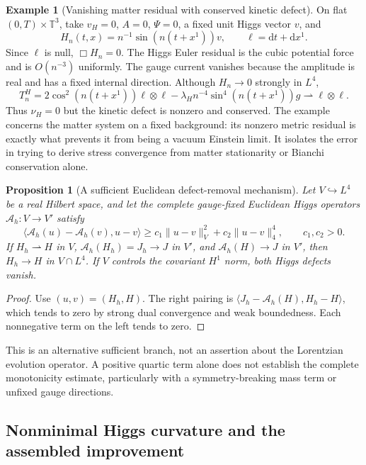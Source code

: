 \documentclass[11pt]{article}
\numberwithin{equation}{section}
\newtheorem{proposition}[proposition]{Proposition}
\theoremstyle{definition}
\newtheorem{example}[example]{Example}
\theoremstyle{remark}
\newcommand{\dd}{\mathrm d}
\newcommand{\norm}[1]{\lVert#1\rVert}
\newcommand{\ip}[2]{\langle#1,#2\rangle}
\begin{document}
\begin{example}[Vanishing matter residual with conserved kinetic defect]
\label{ex:null-wave}
On flat $(0,T)\times\mathbb T^3$, take $v_H=0$, $A=0$, $\Psi=0$, a fixed unit Higgs vector $v$, and
\[
 H_n(t,x)=n^{-1}\sin(n(t+x^1))v,
 \qquad \ell=\dd t+\dd x^1.
\]
Since $\ell$ is null, $\Box H_n=0$. The Higgs Euler residual is the cubic potential force and is $O(n^{-3})$ uniformly. The gauge current vanishes because the amplitude is real and has a fixed internal direction. Although $H_n\to0$ strongly in $L^4$,
\[
 T^H_n
 =2\cos^2(n(t+x^1))\ell\otimes\ell
   -\lambda_Hn^{-4}\sin^4(n(t+x^1))g
 \rightharpoonup\ell\otimes\ell.
\]
Thus $\nu_H=0$ but the kinetic defect is nonzero and conserved. The example concerns the matter system on a fixed background: its nonzero metric residual is exactly what prevents it from being a vacuum Einstein limit. It isolates the error in trying to derive stress convergence from matter stationarity or Bianchi conservation alone.
\end{example}

\begin{proposition}[A sufficient Euclidean defect-removal mechanism]
\label{prop:monotonicity}
Let $V\hookrightarrow L^4$ be a real Hilbert space, and let the complete gauge-fixed Euclidean Higgs operators $\mathcal A_h:V\to V'$ satisfy
\[
 \ip{\mathcal A_h(u)-\mathcal A_h(v)}{u-v}
 \ge c_1\norm{u-v}_V^2+c_2\norm{u-v}_4^4,
 \qquad c_1,c_2>0.
\]
If $H_h\rightharpoonup H$ in $V$, $\mathcal A_h(H_h)=J_h\to J$ in $V'$, and $\mathcal A_h(H)\to J$ in $V'$, then $H_h\to H$ in $V\cap L^4$. If $V$ controls the covariant $H^1$ norm, both Higgs defects vanish.
\end{proposition}
\begin{proof}
Use $(u,v)=(H_h,H)$. The right pairing is
$\ip{J_h-\mathcal A_h(H)}{H_h-H}$, which tends to zero by strong dual convergence and weak boundedness. Each nonnegative term on the left tends to zero.
\end{proof}

This is an alternative sufficient branch, not an assertion about the Lorentzian evolution operator. A positive quartic term alone does not establish the complete monotonicity estimate, particularly with a symmetry-breaking mass term or unfixed gauge directions.

\subsection{Nonminimal Higgs curvature and the assembled improvement}
\label{app:improvement}
\end{document}
